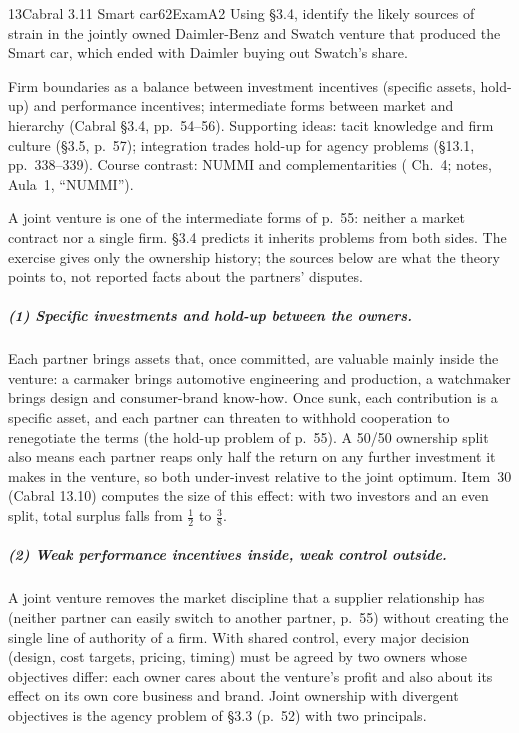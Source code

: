 \begin{exsol}{13}{Cabral 3.11 Smart car}{62}{Exam}{A2}
\asked Using \S3.4, identify the likely sources of strain in the jointly owned Daimler-Benz and
Swatch venture that produced the Smart car, which ended with Daimler buying out Swatch's share.

\method Firm boundaries as a balance between investment incentives (specific assets, hold-up)
and performance incentives; intermediate forms between market and hierarchy (Cabral \S3.4,
pp.~54--56). Supporting ideas: tacit knowledge and firm culture (\S3.5, p.~57); integration
trades hold-up for agency problems (\S13.1, pp.~338--339). Course contrast: NUMMI and
complementarities (\MR{} Ch.~4; notes, Aula~1, ``NUMMI'').

\solution
A joint venture is one of the intermediate forms of p.~55: neither a market contract nor a
single firm. \S3.4 predicts it inherits problems from both sides. The exercise gives only the
ownership history; the sources below are what the theory points to, not reported facts about
the partners' disputes.

\subparagraph{(1) Specific investments and hold-up between the owners.} Each partner brings
assets that, once committed, are valuable mainly inside the venture: a carmaker brings
automotive engineering and production, a watchmaker brings design and consumer-brand know-how.
Once sunk, each contribution is a specific asset,
and each partner can threaten to withhold cooperation to renegotiate the terms (the hold-up
problem of p.~55). A 50/50 ownership split also means each partner reaps only half the return on
any further investment it makes in the venture, so both under-invest relative to the joint
optimum. Item~30 (Cabral 13.10) computes the size of this effect: with two investors and an even
split, total surplus falls from $\tfrac12$ to $\tfrac38$.

\subparagraph{(2) Weak performance incentives inside, weak control outside.} A joint venture
removes the market discipline that a supplier relationship has (neither partner can easily
switch to another partner, p.~55) without creating the single line of authority of a firm.
With shared control, every major decision (design, cost targets, pricing, timing) must be
agreed by two owners whose objectives differ: each owner cares about the venture's profit and
also about its effect on its own core business and brand. Joint ownership with divergent
objectives is the agency problem of \S3.3 (p.~52) with two principals.


\end{exsol}
